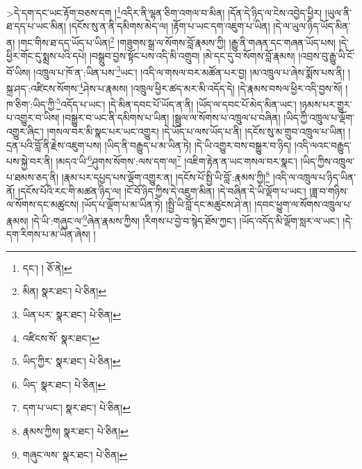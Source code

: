 >དེ་དག་དང་ཡང་རྟོག་བཅས་དག །\footnote{དང་། །  ཅོ་ནེ། }འདིར་ནི་ལྷན་ཅིག་འགལ་བ་མིན། །དོན་དེ་ཉིད་ལ་ངེས་འབྱེད་ཕྱིར། །ཡུལ་ནི་ཐ་དད་པ་ཡང་མིན། །དངོས་སུ་ན་ནི་དམིགས་མེད་ལ། །རྟོག་པ་ཡང་དག་འཇུག་པ་ཡིན། །དེ་ལ་ཡུལ་ཉིད་ཡོད་མིན་ན། །གང་གིས་ཐ་དད་ཡོད་པ་ཡིན།\footnote{མིན།  སྣར་ཐང་།  པེ་ཅིན། } །གཟུགས་སྒྲ་ལ་སོགས་བློ་རྣམས་ཀྱི། །རྒྱུ་ནི་གཞན་དང་གཞན་ཡོད་པས། །དེ་ཕྱིར་གོང་དུ་སྨྲས་པའི་དཔེ། །བསྒྲུབ་བྱས་སྟོང་པས་འདི་མི་འགྲུབ། །མེ་དང་དུ་བ་སོགས་བློ་རྣམས། །འབྲས་བུ་རྒྱུ་ཡི་ངོ་བོ་ཡིས། །འཁྲུལ་པ་ཁོ་ན་:ཡིན་པས་\footnote{ཡིན་པར་  སྣར་ཐང་།  པེ་ཅིན། }ཡང་། །འདི་ལ་གསལ་བར་མཚོན་པར་བྱ། །མ་འཁྲུལ་པ་ཞེས་སྨོས་པས་ནི། །སྐྲ་ཤད་:འཛིངས་སོགས་\footnote{འཛིངས་སོ་  སྣར་ཐང་། }ཤེས་པ་རྣམས། །འཁྲུལ་ཕྱིར་ཚད་མར་མི་འདོད་དེ། །དེ་རྣམས་བསལ་ཕྱིར་འདི་བྱས་སོ། །ཁ་ཅིག་:ཡིད་ཀྱི་\footnote{ཡིད་ཀྱིར་  སྣར་ཐང་།  པེ་ཅིན། }འདོད་པ་ཡང་། །དེ་མིན་དབང་པོ་ཡོད་ན་ནི། །ཡོད་ལ་དབང་པོ་མེད་མིན་ཡང་། །ཉམས་པར་གྱུར་པ་འགྱུར་བ་ཡིས། །བསྒྱུར་བ་ཡང་ནི་དམིགས་པ་ཡིན། །སྦྲུལ་ལ་སོགས་པ་འཁྲུལ་པ་བཞིན། །ཡིད་ཀྱི་འཁྲུལ་པ་ལྡོག་འགྱུར་ཞིང་། །གསལ་བར་མི་སྣང་པར་ཡང་འགྱུར། །དེ་ཡོད་པ་ལས་ཡོད་པ་ནི། །དངོས་སུ་མ་གྲུབ་འཁྲུལ་པ་ཡིན། །དྲན་པའི་བློ་ནི་རྗེས་འཇུག་པས། །ཡིད་ནི་བརྒྱུད་པ་མ་ཡིན་ཏེ། །དེ་ཡི་འགྱུར་བས་བསྒྱུར་བ་ཉིད། །འདི་ལའང་བརྒྱུད་པས་སྐྱེ་བར་ནི། །མདའ་ཡི་\footnote{ཡིད་  སྣར་ཐང་།  པེ་ཅིན། }ཤུགས་སོགས་:ལས་དག་ལ།\footnote{དག་པ་ཡང་།  སྣར་ཐང་།  པེ་ཅིན། } །འཇིག་རྟེན་ན་ཡང་གསལ་བར་སྣང་། །ཡིད་ཀྱིས་འཁྲུལ་པ་ཐམས་ཅད་ནི། །རྣམ་པར་དཔྱད་པས་ལྡོག་འགྱུར་ན། །དངོས་པོ་སྤྱི་ཡི་བློ་:རྣམས་ཀྱི།\footnote{རྣམས་ཀྱིས།  སྣར་ཐང་།  པེ་ཅིན། } །འདི་ལ་འཁྲུལ་པ་ཉིད་ཡིན་ནོ། །དངོས་པོའི་རང་གི་མཚན་ཉིད་ལ། །ངོ་བོ་ཉིད་ཀྱིས་དེ་འཇུག་མིན། །དེ་བཞིན་དེ་ཡི་ལྡོག་པ་ཡང་། །ཟླ་བ་གཉིས་ལ་སོགས་དང་མཚུངས། །ཡོད་པ་ལྡོག་པ་མ་ཡིན་ཏེ། །སྤྱི་ཡི་བློ་དང་མཚུངས་ཤེ་ན། །དབང་ཕྱུག་ལ་སོགས་འཁྲུལ་པ་རྣམས། །དེ་ཡི་:གཞུང་ལ་\footnote{གཞུང་ལས་  སྣར་ཐང་།  པེ་ཅིན། }ཞེན་རྣམས་ཀྱིས། །རིགས་པ་བྱེ་བ་སྙེད་ཐོས་ཀྱང་། །ཡོད་འདོད་མི་ལྡོག་སླར་ལ་ཡང་། །དེ་དག་རིགས་པ་མ་ཡིན་ཞེས། །
